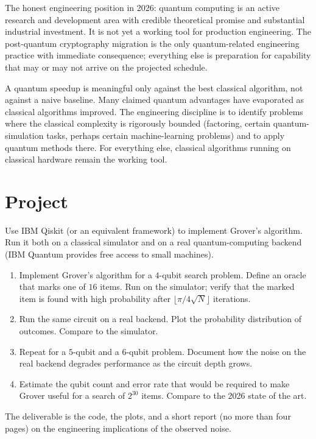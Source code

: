 The honest engineering position in 2026: quantum computing is an active research and development area with credible theoretical promise and substantial industrial investment. It is not yet a working tool for production engineering. The post-quantum cryptography migration is the only quantum-related engineering practice with immediate consequence; everything else is preparation for capability that may or may not arrive on the projected schedule.

\begin{principle}
A quantum speedup is meaningful only against the best classical algorithm, not against a naive baseline. Many claimed quantum advantages have evaporated as classical algorithms improved. The engineering discipline is to identify problems where the classical complexity is rigorously bounded (factoring, certain quantum-simulation tasks, perhaps certain machine-learning problems) and to apply quantum methods there. For everything else, classical algorithms running on classical hardware remain the working tool.
\end{principle}

\section{Project}

\begin{project}
Use IBM Qiskit (or an equivalent framework) to implement Grover's algorithm. Run it both on a classical simulator and on a real quantum-computing backend (IBM Quantum provides free access to small machines).

\begin{enumerate}[leftmargin=*]
  \item Implement Grover's algorithm for a $4$-qubit search problem. Define an oracle that marks one of $16$ items. Run on the simulator; verify that the marked item is found with high probability after $\lfloor \pi/4 \sqrt{N} \rfloor$ iterations.
  \item Run the same circuit on a real backend. Plot the probability distribution of outcomes. Compare to the simulator.
  \item Repeat for a $5$-qubit and a $6$-qubit problem. Document how the noise on the real backend degrades performance as the circuit depth grows.
  \item Estimate the qubit count and error rate that would be required to make Grover useful for a search of $2^{30}$ items. Compare to the 2026 state of the art.
\end{enumerate}

The deliverable is the code, the plots, and a short report (no more than four pages) on the engineering implications of the observed noise.
\end{project}

